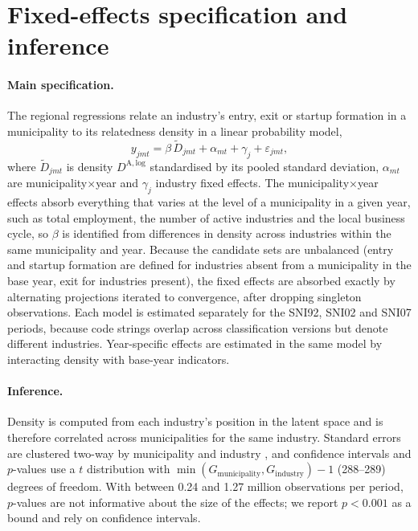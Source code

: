 
\section{Fixed-effects specification and inference}
\label{app:fe_robustness}

\paragraph{Main specification.} The regional regressions relate an industry's
entry, exit or startup formation in a municipality to its relatedness density
in a linear probability model,
\begin{equation}
  y_{jmt} = \beta\, \tilde{D}_{jmt} + \alpha_{mt} + \gamma_{j} + \varepsilon_{jmt},
\end{equation}
where $\tilde{D}_{jmt}$ is density $D^{\mathrm{A,log}}$ standardised by its
pooled standard deviation, $\alpha_{mt}$ are municipality$\times$year and
$\gamma_j$ industry fixed effects. The municipality$\times$year effects absorb
everything that varies at the level of a municipality in a given year, such
as total employment, the number of active industries and the local business
cycle, so $\beta$ is identified from differences in density across
industries within the same municipality and year. Because the candidate sets
are unbalanced (entry and startup formation are defined for industries absent
from a municipality in the base year, exit for industries present), the
fixed effects are absorbed exactly by alternating projections iterated to
convergence, after dropping singleton observations. Each model is estimated
separately for the SNI92, SNI02 and SNI07 periods, because code strings
overlap across classification versions but denote different industries.
Year-specific effects are estimated in the same model by interacting density
with base-year indicators.

\paragraph{Inference.} Density is computed from each industry's position in
the latent space and is therefore correlated across municipalities for the
same industry. Standard errors are clustered two-way by municipality and
industry \citep{cameron2011robust}, and confidence intervals and $p$-values
use a $t$ distribution with $\min(G_{\text{municipality}},
G_{\text{industry}})-1$ (288--289) degrees of freedom. With between 0.24 and 1.27
million observations per period, $p$-values are not informative about the
size of the effects; we report $p<0.001$ as a bound and rely on confidence
intervals.

